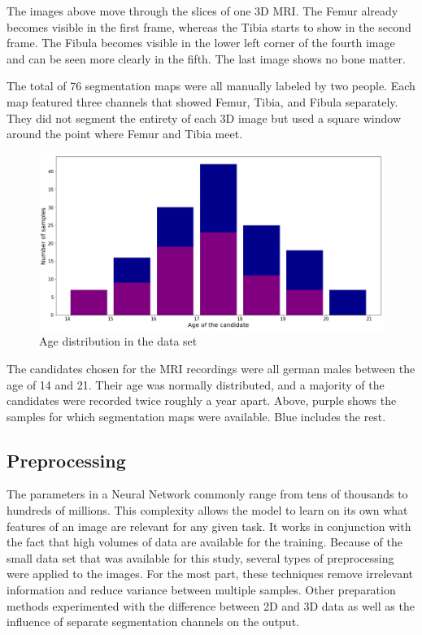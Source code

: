 The images above move through the slices of one 3D MRI. The Femur already becomes visible in the first frame, whereas the Tibia starts to show in the second frame. The Fibula becomes visible in the lower left corner of the fourth image and can be seen more clearly in the fifth. The last image shows no bone matter.

The total of 76 segmentation maps were all manually labeled by two people. Each map featured three channels that showed Femur, Tibia, and Fibula separately. They did not segment the entirety of each 3D image but used a square window around the point where Femur and Tibia meet.

\begin{figure}[H]
\centering
\par
\includegraphics[width=1.0\textwidth]{imgs/age_distr.png}
\caption{Age distribution in the data set}
\par
\end{figure}

The candidates chosen for the MRI recordings were all german males between the age of 14 and 21. Their age was normally distributed, and a majority of the candidates were recorded twice roughly a year apart. Above, purple shows the samples for which segmentation maps were available. Blue includes the rest.

\subsection{Preprocessing}

The parameters in a Neural Network commonly range from tens of thousands to hundreds of millions. This complexity allows the model to learn on its own what features of an image are relevant for any given task. It works in conjunction with the fact that high volumes of data are available for the training. Because of the small data set that was available for this study, several types of preprocessing were applied to the images. For the most part, these techniques remove irrelevant information and reduce variance between multiple samples. Other preparation methods experimented with the difference between 2D and 3D data as well as the influence of separate segmentation channels on the output.

